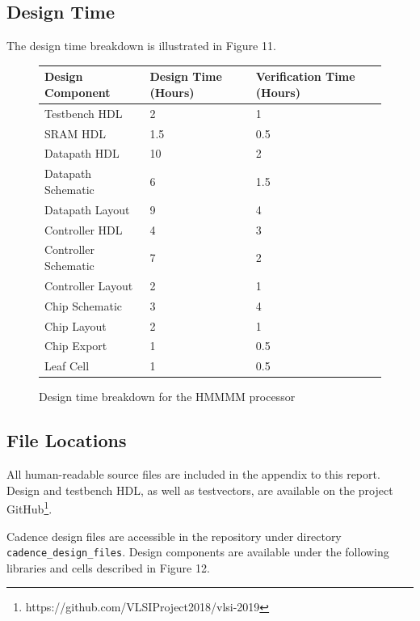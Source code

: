 \documentclass[12pt]{article}
\begin{document}
\subsection{Design Time}

The design time breakdown is illustrated in Figure 11.

\begin{figure}[H]
    \begin{center}
    \begin{tabular}{lll}
        Design Component & Design Time (Hours) & Verification Time (Hours) \\
        \hline
        Testbench HDL & 2 & 1 \\
        SRAM HDL & 1.5 & 0.5 \\
        Datapath HDL & 10 & 2 \\
        Datapath Schematic & 6 & 1.5\\
        Datapath Layout & 9 & 4 \\
        Controller HDL & 4 & 3 \\
        Controller Schematic & 7 & 2 \\
        Controller Layout & 2 & 1 \\
        Chip Schematic & 3 & 4 \\
        Chip Layout & 2 & 1\\
        Chip Export & 1 & 0.5 \\
        Leaf Cell & 1 & 0.5 \\
    \end{tabular}
    \caption{Design time breakdown for the HMMMM processor}
    \end{center}
    \label{fig:designtime}
\end{figure}

\subsection{File Locations}

All human-readable source files are included in the appendix to this report. Design and testbench HDL, as well as testvectors, are available on the project GitHub\footnote{https://github.com/VLSIProject2018/vlsi-2019}. 

Cadence design files are accessible in the repository under directory \texttt{cadence\_design\_files}. Design components are available under the following libraries and cells described in Figure 12.
\end{document}
